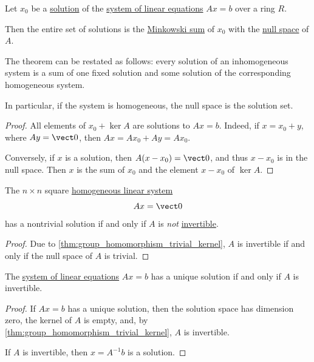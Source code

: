 \begin{proposition}\label{thm:linear_system_solutions}
  Let \( x_0 \) be a \hyperref[def:fol_equation/semantic_solution]{solution} of the \hyperref[def:system_of_linear_equations]{system of linear equations} \( Ax = b \) over a ring \( R \).

  Then the entire set of solutions is the \hyperref[def:power_semigroup]{Minkowski sum} of \( x_0 \) with the \hyperref[def:module/kernel]{null space} of \( A \).
\end{proposition}
\begin{comments}
  \item The theorem can be restated as follows: every solution of an inhomogeneous system is a sum of one fixed solution and some solution of the corresponding homogeneous system.

  \item In particular, if the system is homogeneous, the null space is the solution set.
\end{comments}
\begin{proof}
  All elements of \( x_0 + \ker A \) are solutions to \( Ax = b \). Indeed, if \( x = x_0 + y \), where \( Ay = \vect 0 \), then \( Ax = Ax_0 + Ay = Ax_0 \).

  Conversely, if \( x \) is a solution, then \( A(x - x_0) = \vect 0 \), and thus \( x - x_0 \) is in the null space. Then \( x \) is the sum of \( x_0 \) and the element \( x - x_0 \) of \( \ker A \).
\end{proof}

\begin{corollary}\label{thm:homogeneous_linear_equations_solutions}
  The \( n \times n \) square \hyperref[def:system_of_linear_equations/homogeneous]{homogeneous linear system}
  \begin{equation*}
    Ax = \vect 0
  \end{equation*}
  has a nontrivial solution if and only if \( A \) is \emph{not} \hyperref[def:inverse_matrix]{invertible}.
\end{corollary}
\begin{proof}
  Due to \cref{thm:group_homomorphism_trivial_kernel}, \( A \) is invertible if and only if the null space of \( A \) is trivial.
\end{proof}

\begin{corollary}\label{thm:system_of_equations_unique_solution}
  The \hyperref[def:system_of_linear_equations]{system of linear equations} \( Ax = b \) has a unique solution if and only if \( A \) is invertible.
\end{corollary}
\begin{proof}
  \SufficiencySubProof If \( Ax = b \) has a unique solution, then the solution space has dimension zero, the kernel of \( A \) is empty, and, by \cref{thm:group_homomorphism_trivial_kernel}, \( A \) is invertible.

  \NecessitySubProof If \( A \) is invertible, then \( x = A^{-1} b \) is a solution.
\end{proof}

